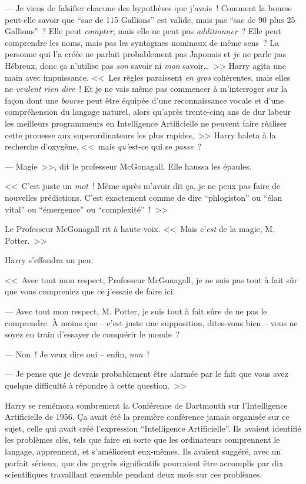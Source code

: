--- Je viens de falsifier chacune des hypothèses que j'avais~! Comment la bourse peut-elle savoir que “sac de 115 Gallions” est valide, mais pas “sac de 90 plus 25 Gallions”~? Elle peut \emph{compter}, mais elle ne peut pas \emph{additionner}~? Elle peut comprendre les noms, mais pas les syntagmes nominaux de même sens~? La personne qui l'a créée ne parlait probablement pas Japonais et \emph{je} ne parle pas Hébreux, donc ça n'utilise pas \emph{son} savoir ni \emph{mon} savoir…~>> Harry agita une main avec impuissance. <<~Les règles paraissent \emph{en gros} cohérentes, mais elles ne \emph{veulent rien dire}~! Et je ne vais même pas commencer à m'interroger sur la façon dont une \emph{bourse} peut être équipée d'une reconnaissance vocale et d'une compréhension du langage naturel, alors qu'après trente-cinq ans de dur labeur les meilleurs programmeurs en Intelligence Artificielle ne peuvent faire réaliser cette prouesse aux superordinateurs les plus rapides,~>> Harry haleta à la recherche d'oxygène, <<~mais \emph{qu'}est-ce qui se \emph{passe}~?

--- Magie~>>, dit le professeur McGonagall. Elle haussa les épaules.

<<~C'est juste un \emph{mot}~! Même après m'avoir dit ça, je ne peux pas faire de nouvelles prédictions. C'est exactement comme de dire “phlogiston” ou “élan vital” ou “émergence” ou “complexité”~!~>>

Le Professeur McGonagall rit à haute voix. <<~Mais c'\emph{est} de la magie, M. Potter.~>>

Harry s'effondra un peu.

<<~Avec tout mon respect, Professeur McGonagall, je ne suis pas tout à fait sûr que vous compreniez que ce j'essaie de faire ici.

--- Avec tout mon respect, M. Potter, je suis tout à fait sûre de ne pas le comprendre. À moins que -- c'est juste une supposition, dites-vous bien -- vous ne soyez en train d'essayer de conquérir le monde~?

--- Non~! Je veux dire oui -- enfin, \emph{non}~!

--- Je pense que je devrais probablement être alarmée par le fait que vous avez quelque difficulté à répondre à cette question.~>>

Harry se remémora sombrement la Conférence de Dartmouth sur l'Intelligence Artificielle de 1956. Ça avait été la première conférence jamais organisée sur ce sujet, celle qui avait créé l'expression “Intelligence Artificielle”. Ils avaient identifié les problèmes clés, tels que faire en sorte que les ordinateurs comprennent le langage, apprennent, et s'améliorent eux-mêmes. Ils avaient suggéré, avec un parfait sérieux, que des progrès significatifs pourraient être accomplis par dix scientifiques travaillant ensemble pendant deux mois sur ces problèmes.

